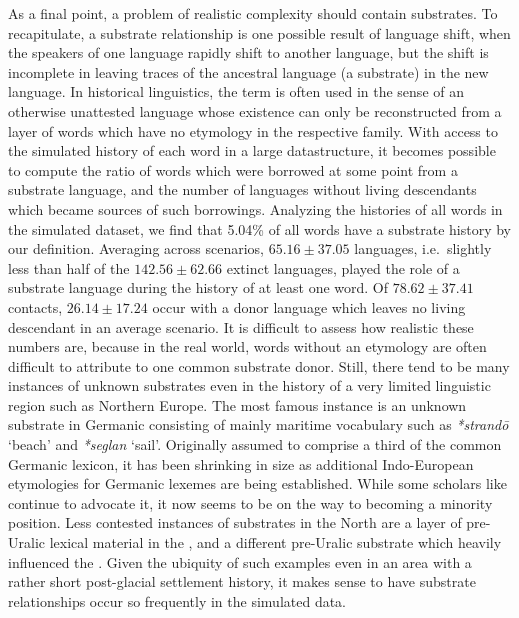 \largerpage
As a final point, a problem of realistic complexity should contain substrates. To recapitulate, a substrate relationship is one possible result of language shift, when the speakers of one language rapidly shift to another language, but the shift is incomplete in leaving traces of the ancestral language (a substrate) in the new language. In historical linguistics, the term \textit{} is often used in the sense of an otherwise unattested language whose existence can only be reconstructed from a layer of words which have no etymology in the respective family. With access to the simulated history of each word in a large datastructure, it becomes possible to compute the ratio of words which were borrowed at some point from a substrate language, and the number of languages without living descendants which became sources of such borrowings. Analyzing the histories of all words in the simulated dataset, we find that 5.04\% of all words have a substrate history by our definition. Averaging 
across scenarios, $65.16 \pm 37.05$ languages, i.e.\ slightly less than half of the $142.56 \pm 62.66$ extinct languages, played the role of a substrate language during the history of at least one word. Of $78.62 \pm 37.41$ contacts, $26.14 \pm 17.24$ occur with a donor language which leaves no living descendant in an average scenario. It is difficult to assess how realistic these numbers are, because in the real world, words without an etymology are often difficult to attribute to one common substrate donor. Still, there tend to be many instances of unknown substrates even in the history of a very limited linguistic region such as Northern Europe. The most famous instance is an unknown substrate in Germanic consisting of mainly maritime vocabulary such as \textit{*strand\={o}} `beach' and \textit{*seglan} `sail'. Originally assumed to comprise a third of the common Germanic lexicon, it has been shrinking in size as additional Indo-European etymologies for Germanic lexemes are being 
established. While some scholars like \cite{hawkins1990} continue to advocate it, it now seems to be on the way to becoming a minority position. Less contested instances of substrates in the North are a layer of pre-Uralic lexical material in the  \citep{aikio2004}, and a different pre-Uralic substrate which heavily influenced the  \citep[e.g.][]{helimski1998}. Given the ubiquity of such examples even in an area with a rather short post-glacial settlement history, it makes sense to have substrate relationships occur so frequently in the simulated data.

